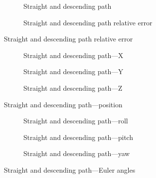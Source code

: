 \begin{figure}[H]
    \centering
    \begin{subfigure}{0.45\textwidth}
        
        \caption{Straight and descending path}\label{fig:straight-descending}
    \end{subfigure}
    \begin{subfigure}{0.45\textwidth}
        
        \caption{Straight and descending path relative error}\label{fig:straight-descending-error}
    \end{subfigure}
\end{figure}

\begin{figure}[H]
    \centering
    \begin{subfigure}{0.3\textwidth}
        
        \caption{Straight and descending path---X}
    \end{subfigure}
    \hfill
    \begin{subfigure}{0.3\textwidth}
        
        \caption{Straight and descending path---Y}
    \end{subfigure}
    \hfill
    \begin{subfigure}{0.3\textwidth}
        
        \caption{Straight and descending path---Z}
    \end{subfigure}
    \caption{Straight and descending path---position}\label{fig:straight-descending-pos}
\end{figure}

\begin{figure}[H]
    \centering
    \begin{subfigure}{0.3\textwidth}
        
        \caption{Straight and descending path---roll}
    \end{subfigure}
    \hfill
    \begin{subfigure}{0.3\textwidth}
        
        \caption{Straight and descending path---pitch}
    \end{subfigure}
    \hfill
    \begin{subfigure}{0.3\textwidth}
        
        \caption{Straight and descending path---yaw}
    \end{subfigure}
    \caption{Straight and descending path---Euler angles}\label{fig:straight-descending-euler}
\end{figure}

